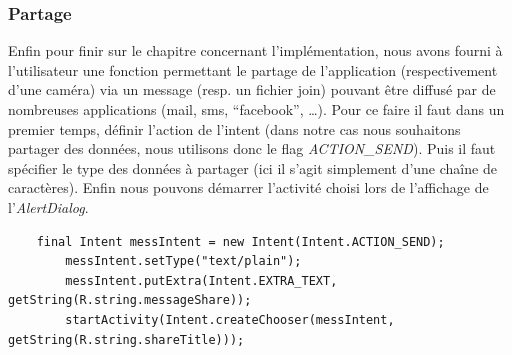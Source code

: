 \subsubsection{Partage}
Enfin pour finir sur le chapitre concernant l'implémentation, nous avons fourni
à l'utilisateur une fonction permettant le partage de l'application
(respectivement d'une caméra) via un message (resp. un fichier join) pouvant
être diffusé par de nombreuses applications (mail, sms, ``facebook'', \ldots).
Pour ce faire il faut dans un premier temps, définir l'action de
l'intent (dans notre cas nous souhaitons partager des données, nous utilisons donc le flag
\textit{ACTION\_SEND}). Puis il faut spécifier le type des données à partager
(ici il s'agit simplement d'une chaîne de caractères).
Enfin nous pouvons démarrer l'activité choisi lors de l'affichage de
l'\textit{AlertDialog}.
\begin{lstlisting}
    final Intent messIntent = new Intent(Intent.ACTION_SEND);
	    messIntent.setType("text/plain");
	    messIntent.putExtra(Intent.EXTRA_TEXT, getString(R.string.messageShare));
	    startActivity(Intent.createChooser(messIntent, getString(R.string.shareTitle)));
\end{lstlisting}

